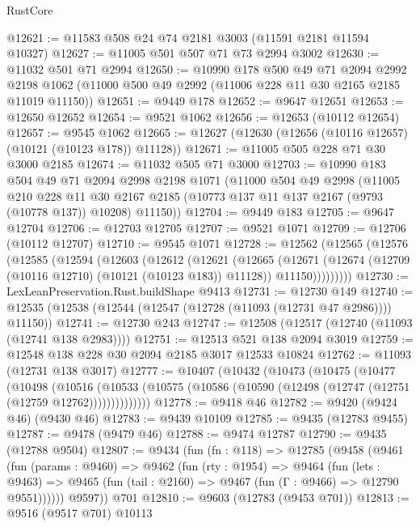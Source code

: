 \begin{lexlean}{RustCore}
\begin{coremodule}
@12621 := @11583 @508 @24 @74 @2181 @3003 (@11591 @2181 @11594 @10327)
@12627 := @11005 @501 @507 @71 @73 @2994 @3002
@12630 := @11032 @501 @71 @2994
@12650 := @10990
    @178
    @500
    @49
    @71
    @2094
    @2992
    @2198
    @1062
    (@11000 @500 @49 @2992 (@11006 @228 @11 @30 @2165 @2185 @11019 @11150))
@12651 := @9449 @178
@12652 := @9647 @12651
@12653 := @12650 @12652
@12654 := @9521 @1062
@12656 := @12653 (@10112 @12654)
@12657 := @9545 @1062
@12665 := @12627 (@12630 (@12656 (@10116 @12657) (@10121 (@10123 @178)) @11128))
@12671 := @11005 @505 @228 @71 @30 @3000 @2185
@12674 := @11032 @505 @71 @3000
@12703 := @10990
    @183
    @504
    @49
    @71
    @2094
    @2998
    @2198
    @1071
    (@11000
      @504
      @49
      @2998
      (@11005
        @210
        @228
        @11
        @30
        @2167
        @2185
        (@10773 @137 @11 @137 @2167 (@9793 (@10778 @137)) @10208)
        @11150))
@12704 := @9449 @183
@12705 := @9647 @12704
@12706 := @12703 @12705
@12707 := @9521 @1071
@12709 := @12706 (@10112 @12707)
@12710 := @9545 @1071
@12728 := @12562
    (@12565
      (@12576
        (@12585
          (@12594
            (@12603
              (@12612
                (@12621
                  (@12665
                    (@12671
                      (@12674 (@12709 (@10116 @12710) (@10121 (@10123 @183)) @11128))
                      @11150)))))))))
@12730 := LexLeanPreservation.Rust.buildShape @9413
@12731 := @12730 @149
@12740 := @12535 (@12538 (@12544 (@12547 (@12728 (@11093 (@12731 @47 @2986)))) @11150))
@12741 := @12730 @243
@12747 := @12508 (@12517 (@12740 (@11093 (@12741 @138 @2983))))
@12751 := @12513 @521 @138 @2094 @3019
@12759 := @12548 @138 @228 @30 @2094 @2185 @3017 @12533 @10824
@12762 := @11093 (@12731 @138 @3017)
@12777 := @10407
    (@10432
      (@10473
        (@10475
          (@10477
            (@10498
              (@10516
                (@10533 (@10575 (@10586 (@10590 (@12498 (@12747 (@12751 (@12759 @12762))))))))))))))
@12778 := @9418 @46
@12782 := @9420 (@9424 @46) (@9430 @46)
@12783 := @9439 @10109
@12785 := @9435 (@12783 @9455)
@12787 := @9478 (@9479 @46)
@12788 := @9474 @12787
@12790 := @9435 (@12788 @9504)
@12807 := @9434
    (fun (fn : @118) =>
    @12785
      (@9458
        (@9461
          (fun (params : @9460) =>
          @9462
            (fun (rty : @1954) =>
            @9464
              (fun (lets : @9463) =>
              @9465 (fun (tail : @2160) => @9467 (fun (Γ : @9466) => @12790 @9551))))))
        @9597))
    @701
@12810 := @9603 (@12783 (@9453 @701))
@12813 := @9516 (@9517 @701) @10113

\end{coremodule}
\end{lexlean}

